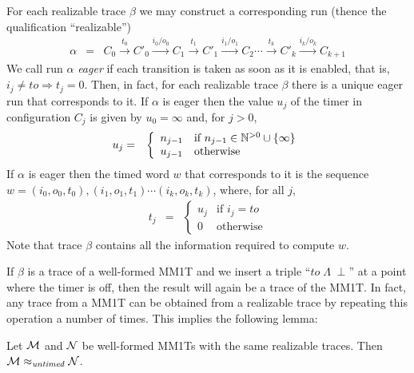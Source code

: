 For each realizable trace $\beta$ we may construct a corresponding run (thence the qualification ``realizable'')
\begin{eqnarray*}
\alpha & = & C_0 \xrightarrow{t_0} C'_0 \xrightarrow{i_0/o_0} C_1 \xrightarrow{t_1} C'_1 \xrightarrow{i_1/o_1} C_2 \cdots
\xrightarrow{t_k} C'_k \xrightarrow{i_k/o_k} C_{k+1}
\end{eqnarray*}
We call run $\alpha$ \emph{eager} if each transition is taken as soon as it is enabled, that is,
$i_j \neq \mathit{to} \Rightarrow t_j = 0$.
Then, in fact, for each realizable trace $\beta$ there is a unique eager run that corresponds to it.
If $\alpha$ is eager then the value $u_j$ of the timer in configuration $C_j$ is given by $u_0 = \infty$ and, for $j>0$,
\begin{eqnarray*}
u_j & = & \left\{ \begin{array}{ll} 
n_{j-1} & \mbox{if } n_{j-1} \in {\mathbb N}^{>0} \cup \{\infty\}\\
u_{j-1} & \mbox{otherwise}
\end{array} \right.
\end{eqnarray*}
If $\alpha$ is eager then the timed word $w$ that corresponds to it is the sequence
$w = (i_0, o_0, t_0), (i_1, o_1, t_1) \cdots (i_k, o_k, t_k)$,
where, for all $j$,
\begin{eqnarray*}
t_j & = & \left\{ \begin{array}{ll} 
u_j & \mbox{if } i_j = \mathit{to}\\
0   & \mbox{otherwise}
\end{array}\right.
\end{eqnarray*}
Note that trace $\beta$ contains all the information required to compute $w$.

If $\beta$ is a trace of a well-formed MM1T and we insert a triple ``$\mathit{to} \; \Lambda\; \perp$'' at a point where 
the timer is off, then the result will again be a trace of the MM1T.
In fact, any trace from a MM1T can be obtained from a realizable trace by repeating this operation a number of times.
This implies the following lemma:

\begin{lemma}
\label{realizable}
Let ${\cal M}$ and ${\cal N}$ be well-formed MM1Ts with the same realizable traces.
Then  ${\cal M} \approx_{\mathit{untimed}} {\cal N}$.
\end{lemma}


